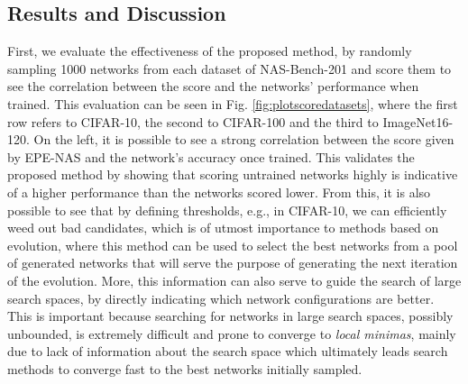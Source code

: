 \documentclass[10pt, conference]{IEEEtran}
\begin{document}
\subsection{Results and Discussion}
First, we evaluate the effectiveness of the proposed method, by randomly sampling 1000 networks from each dataset of NAS-Bench-201 and score them to see the correlation between the score and the networks' performance when trained. This evaluation can be seen in Fig. \ref{fig:plotscoredatasets}, where the first row refers to CIFAR-10, the second to CIFAR-100 and the third to ImageNet16-120. On the left, it is possible to see a strong correlation between the score given by EPE-NAS and the network's accuracy once trained. This validates the proposed method by showing that scoring untrained networks highly is indicative of a higher performance than the networks scored lower. From this, it is also possible to see that by defining thresholds, e.g.,  in CIFAR-10, we can efficiently weed out bad candidates, which is of utmost importance to methods based on evolution, where this method can be used to select the best networks from a pool of generated networks that will serve the purpose of generating the next iteration of the evolution. More, this information can also serve to guide the search of large search spaces, by directly indicating which network configurations are better. This is important because searching for networks in large search spaces, possibly unbounded, is extremely difficult and prone to converge to \textit{local minimas}, mainly due to lack of information about the search space which ultimately leads search methods to converge fast to the best networks initially sampled.
\end{document}
